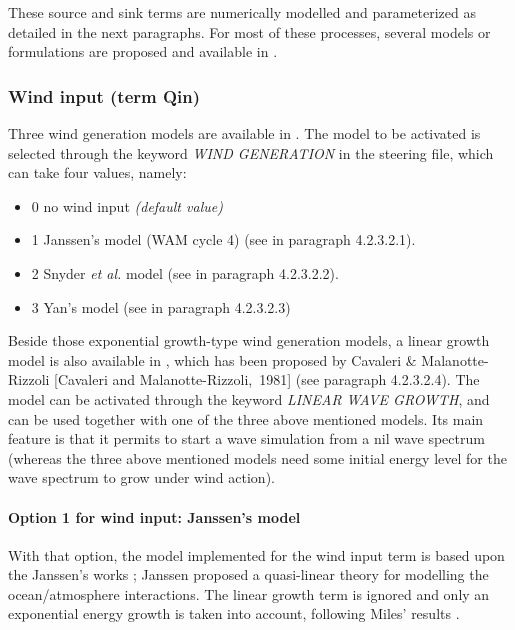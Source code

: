 These source and sink terms are numerically modelled and parameterized as detailed in the next paragraphs. For most of these processes, several models or formulations are proposed and available in \tomawac.


\subsubsection{ Wind input (term Qin)}

 Three wind generation models are available in \tomawac. The model to be activated is selected through the keyword \textit{WIND GENERATION} in the steering file, which can take four values, namely:

\begin{itemize}
\item  0 no wind input \textit{(default value)}
\item  1 Janssen's model \cite{Janssen1989} \cite{Janssen1991} (WAM cycle 4) (see in paragraph 4.2.3.2.1).
\item  2 Snyder \textit{et al. }model \cite{Snyder1981} (see in paragraph 4.2.3.2.2).
\item  3 Yan's model \cite{Yan1987} (see in paragraph 4.2.3.2.3)
\end{itemize}

 Beside those exponential growth-type wind generation models, a linear growth model is also available in \tomawac, which has been proposed by Cavaleri \& Malanotte-Rizzoli [Cavaleri and Malanotte-Rizzoli,~1981] (see paragraph 4.2.3.2.4). The model can be activated through the keyword \textit{LINEAR WAVE GROWTH}, and can be used together with one of the three above mentioned models. Its main feature is that it permits to start a wave simulation from a nil wave spectrum (whereas the three above mentioned models need some initial energy level for the wave spectrum to grow under wind action).


  \paragraph{Option 1 for wind input: Janssen's model}

 With that option, the model implemented for the wind input term is based upon the Janssen's works \cite{Janssen1989} \cite{Janssen1991}; Janssen proposed a quasi-linear theory for modelling the ocean/atmosphere interactions. The linear growth term is ignored and only an exponential energy growth is taken into account, following Miles' results \cite{Miles1957}.

